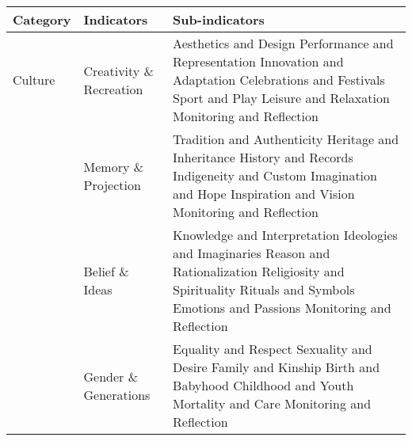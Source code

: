 \begin{table}[th]
\begin{center}
\begin{tabular}{ >{\raggedright\arraybackslash}p{} >{\raggedright\arraybackslash}p{} >{\raggedright\arraybackslash}p{} }
\hline
Category & Indicators & Sub-indicators \\
\hline
Culture & Creativity \& Recreation & Aesthetics and Design \linebreak Performance and Representation \linebreak Innovation and Adaptation \linebreak Celebrations and Festivals \linebreak Sport and Play \linebreak Leisure and Relaxation \linebreak Monitoring and Reflection \linebreak \\
  & Memory \& Projection & Tradition and Authenticity \linebreak Heritage and Inheritance \linebreak History and Records \linebreak Indigeneity and Custom \linebreak Imagination and Hope \linebreak Inspiration and Vision \linebreak Monitoring and Reflection \linebreak \\
  & Belief \& Ideas & Knowledge and Interpretation \linebreak Ideologies and Imaginaries \linebreak Reason and Rationalization \linebreak Religiosity and Spirituality \linebreak Rituals and Symbols \linebreak Emotions and Passions \linebreak Monitoring and Reflection \linebreak \\
  & Gender \& Generations & Equality and Respect \linebreak Sexuality and Desire \linebreak Family and Kinship \linebreak Birth and Babyhood \linebreak Childhood and Youth \linebreak Mortality and Care \linebreak Monitoring and Reflection \linebreak \\

\end{tabular}
\end{center}
\end{table}
